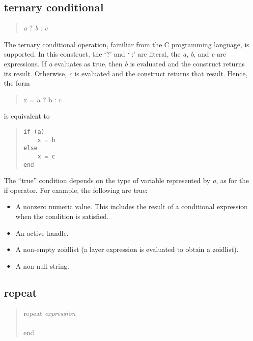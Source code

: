 \subsection{ternary conditional}

\begin{quote}
{\it a} {\vt ?} {\it b} {\vt :} {\it c}
\end{quote}
 
The ternary conditional operation, familiar from the C programming
language, is supported.  In this construct, the `{\vt ?}' and `{\vt
:}' are literal, the {\it a\/}, {\it b\/}, and {\it c} are
expressions.  If {\it a} evaluates as {\vt true}, then {\it b} is
evaluated and the construct returns its result.  Otherwise, {\it c} is
evaluated and the construct returns that result.  Hence, the form
 
\begin{quote}\vt
x = a ? b : c
\end{quote}
 
is equivalent to
 
\begin{quote}\vt
\begin{verbatim}
if (a)
    x = b
else
    x = c
end
\end{verbatim}
\end{quote}
 
The ``{\vt true}'' condition depends on the type of variable
represented by {\it a}, as for the {\vt if} operator.  For example,
the following are {\vt true}:

\begin{itemize}
\item{A nonzero numeric value.  This includes the result of a
conditional expression when the condition is satisfied.}

\item{An active handle.}

\item{A non-empty zoidlist (a layer expression is evaluated to obtain
a zoidlist).}

\item{A non-null string.}
\end{itemize}

\subsection{\vt repeat}

\begin{quote}
{\vt repeat} {\it expression}\\
\hspace*{2em}{\it statements}\\
{\vt end}
\end{quote}

